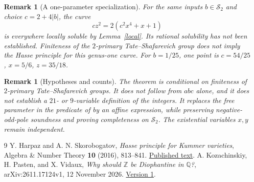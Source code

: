 \documentclass[11pt]{article}
\newtheorem{remark}[theorem]{Remark}
\begin{document}
\begin{remark}[A one-parameter specialization]
For the same inputs $b\in\mathcal S_2$ and choice $c=2+4|b|$, the curve
\[
 cz^2=2(c^2x^4+x+1)
\]
is everywhere locally soluble by Lemma~\ref{local}. Its rational solubility has not been established.
Finiteness of the $2$-primary Tate--Shafarevich group does not imply the
Hasse principle for this genus-one curve. For $b=1/25$, one point is
$c=54/25$, $x=5/6$, $z=35/18$.
\end{remark}

\begin{remark}[Hypotheses and counts]
The theorem is conditional on finiteness of $2$-primary
Tate--Shafarevich groups. It does not follow from $abc$ alone, and it
does not establish a $21$- or $9$-variable definition of the integers.
It replaces the free parameter in the predicate of
\cite[Section~4]{KPV} by an affine expression, while preserving
negative-odd-pole soundness and proving completeness on
$\mathcal S_2$. The existential variables $x,y$ remain independent.
\end{remark}

\begin{thebibliography}{9}
 Y. Harpaz and A. N. Skorobogatov,
\emph{Hasse principle for Kummer varieties},
Algebra \& Number Theory \textbf{10} (2016), 813--841.
\href{https://msp.org/ant/2016/10-4/ant-v10-n4-p05-p.pdf}{Published text}.
 A. Kozachinskiy, H. Pasten, and X. Vidaux,
\emph{Why should $\mathbb Z$ be Diophantine in $\mathbb Q$?},
arXiv:2611.17124v1, 12 November 2026.
\href{https://arxiv.org/html/2611.17124v1}{Version 1}.
\end{thebibliography}
\end{document}
